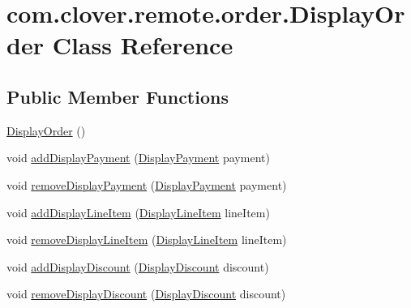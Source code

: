 \hypertarget{classcom_1_1clover_1_1remote_1_1order_1_1_display_order}{}\section{com.\+clover.\+remote.\+order.\+Display\+Order Class Reference}
\label{classcom_1_1clover_1_1remote_1_1order_1_1_display_order}
\subsection*{Public Member Functions}
\begin{DoxyCompactItemize}
\item 
\hyperlink{classcom_1_1clover_1_1remote_1_1order_1_1_display_order_a7b41c782040d1189e03221bd3cd12ce0}{Display\+Order} ()
\item 
void \hyperlink{classcom_1_1clover_1_1remote_1_1order_1_1_display_order_ac666c0167f632e3ce8fec5c940581a4a}{add\+Display\+Payment} (\hyperlink{classcom_1_1clover_1_1remote_1_1order_1_1_display_payment}{Display\+Payment} payment)
\item 
void \hyperlink{classcom_1_1clover_1_1remote_1_1order_1_1_display_order_a93b6116a98724b2529dd5bce2d139e3b}{remove\+Display\+Payment} (\hyperlink{classcom_1_1clover_1_1remote_1_1order_1_1_display_payment}{Display\+Payment} payment)
\item 
void \hyperlink{classcom_1_1clover_1_1remote_1_1order_1_1_display_order_a5e335d8943ca823431bc7467cf2762f7}{add\+Display\+Line\+Item} (\hyperlink{classcom_1_1clover_1_1remote_1_1order_1_1_display_line_item}{Display\+Line\+Item} line\+Item)
\item 
void \hyperlink{classcom_1_1clover_1_1remote_1_1order_1_1_display_order_a384177b5a08daade83d86e77ad811dbe}{remove\+Display\+Line\+Item} (\hyperlink{classcom_1_1clover_1_1remote_1_1order_1_1_display_line_item}{Display\+Line\+Item} line\+Item)
\item 
void \hyperlink{classcom_1_1clover_1_1remote_1_1order_1_1_display_order_aa28c0fbaed8ca1aaef98cb16cd306918}{add\+Display\+Discount} (\hyperlink{classcom_1_1clover_1_1remote_1_1order_1_1_display_discount}{Display\+Discount} discount)
\item 
void \hyperlink{classcom_1_1clover_1_1remote_1_1order_1_1_display_order_abdafaa9185284865e4acf22550ea6ebd}{remove\+Display\+Discount} (\hyperlink{classcom_1_1clover_1_1remote_1_1order_1_1_display_discount}{Display\+Discount} discount)
\end{DoxyCompactItemize}
